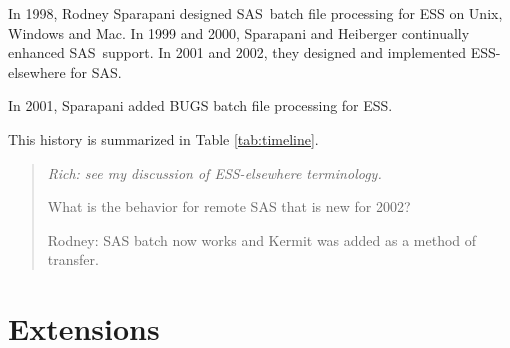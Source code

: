 \documentclass{article}
\newcommand*{\SAS}{\textsc{SAS}}
\newenvironment{Comment}{\begin{quote}\small\itshape }{\end{quote}}
\begin{document}
In 1998, Rodney Sparapani designed \SAS\ batch file processing for ESS
on Unix, Windows and Mac.  In 1999 and 2000, Sparapani and Heiberger
continually enhanced \SAS\ support. 
In 2001 and 2002, they designed and implemented ESS-elsewhere for \SAS.  

In 2001, Sparapani added BUGS batch file processing for ESS.

This history is summarized in Table \ref{tab:timeline}.

\begin{Comment}
Rich: see my discussion of ESS-elsewhere terminology.

What is the behavior for remote SAS that is new for 2002?

Rodney: SAS batch now works and Kermit was added as a method of transfer.
\end{Comment}


\section{Extensions}
\label{sec:extensions}

\end{document}
